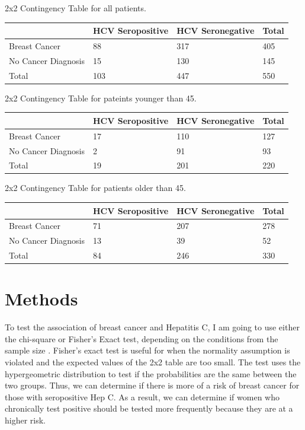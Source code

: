 \documentclass[12pt, titlepage]{article}
\begin{document}
\vspace{1cm}

2x2 Contingency Table for all patients.

\begin{tabular}{ | m{4cm} | m{4cm}| m{4cm} | m{2cm} | }
  \label{table:total}
  \hline
    & HCV Seropositive & HCV Seronegative & Total\\ 
  \hline
  Breast Cancer & 88 & 317 & 405 \\ 
  \hline
  No Cancer Diagnosis & 15 & 130 & 145 \\ 
  \hline
  Total & 103 & 447 & 550 \\ 
  \hline
\end{tabular}

\vspace{1cm}

2x2 Contingency Table for pateints younger than 45.

\begin{tabular}{ | m{4cm} | m{4cm}| m{4cm} | m{2cm} | }
  \label{table:young}
  \hline
    & HCV Seropositive & HCV Seronegative & Total\\ 
  \hline
  Breast Cancer & 17 & 110 & 127 \\ 
  \hline
  No Cancer Diagnosis & 2 & 91 & 93 \\ 
  \hline
  Total & 19 & 201 & 220 \\ 
  \hline
\end{tabular}

\vspace{1cm}

2x2 Contingency Table for patients older than 45.

\begin{tabular}{ | m{4cm} | m{4cm}| m{4cm} | m{2cm} | }
  \label{table:old}
  \hline
    & HCV Seropositive & HCV Seronegative & Total\\ 
  \hline
  Breast Cancer & 71 & 207 & 278 \\ 
  \hline
  No Cancer Diagnosis & 13 & 39 & 52 \\ 
  \hline
  Total & 84 & 246 & 330 \\ 
  \hline
\end{tabular}

\section{Methods}
\label{sec:methods}

To test the association of breast cancer and Hepatitis C, I am going to use either the chi-square or Fisher's Exact test, depending on the
conditions from the sample size \citep{warner2013testing}. Fisher's exact test is useful for when the normality assumption is violated 
and the expected values of the 2x2 table are too small. The test uses the hypergeometric distribution to test if the probabilities are
the same between the two groups. Thus, we can determine if there is more of a risk of breast cancer for those with seropositive Hep C. As
 a result, we can determine if women who chronically test positive should be tested more frequently because they are at a higher risk. 
 
\end{document}
